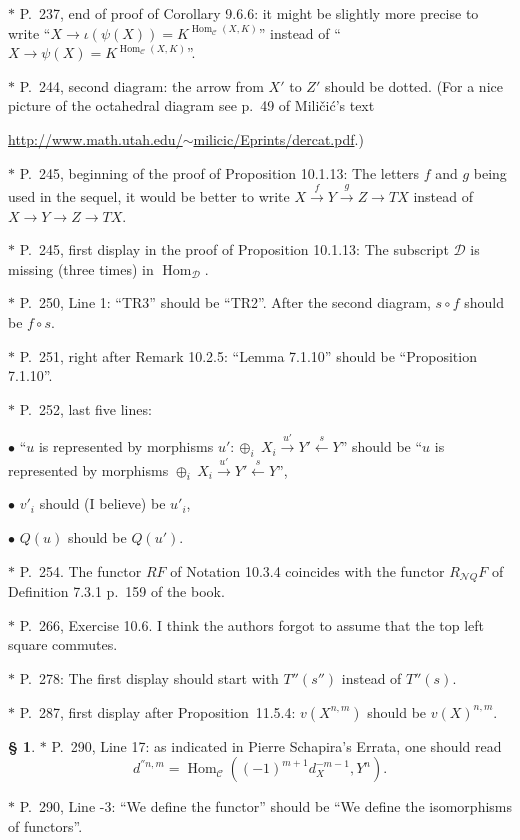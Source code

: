 \documentclass[12pt]{article}%
\theoremstyle{remark}
\theoremstyle{definition}
\newtheorem{s}[thm]{\S}%
\newcommand{\bu}{\bullet}
\newcommand{\nn}{\noindent}
\newcommand{\cc}{\mathcal}
\newcommand{\C}{\mathcal C}
\newcommand{\xr}{\xrightarrow}
\DeclareMathOperator{\Hom}{Hom}%
\begin{document}
\nn$*$ P.~237, end of proof of Corollary 9.6.6: it might be slightly more precise to write ``$X\to\iota(\psi(X))=K^{\Hom_\C(X,K)}$'' instead of ``$X\to\psi(X)=K^{\Hom_\C(X,K)}$''.

\nn$*$ P.~244, second diagram: the arrow from $X'$ to $Z'$ should be dotted. (For a nice picture of the octahedral diagram see p.~49 of Mili\v{c}i\'c's text

\href{http://www.math.utah.edu/~milicic/Eprints/dercat.pdf}{http://www.math.utah.edu/$\sim$milicic/Eprints/dercat.pdf}.)

\nn$*$ P.~245, beginning of the proof of Proposition 10.1.13: The letters $f$ and $g$ being used in the sequel, it would be better to write $X\xr fY\xr gZ\to TX$ instead of $X\to Y\to Z\to TX$. 

\nn$*$ P.~245, first display in the proof of Proposition 10.1.13: The subscript $\cc D$ is missing (three times) in $\Hom_{\cc D}$.

\nn$*$ P.~250, Line 1: ``TR3'' should be ``TR2''. After the second diagram, $s\circ f$ should be $f\circ s$.

\nn$*$ P.~251, right after Remark 10.2.5: ``Lemma 7.1.10'' should be ``Proposition 7.1.10''.

\nn$*$ P.~252, last five lines:

$\bu$ ``$u$ is represented by morphisms $u':\oplus_i\ X_i\xr{u'}Y'\xleftarrow sY$'' should be ``$u$ is represented by morphisms $\oplus_i\ X_i\xr{u'}Y'\xleftarrow sY$'',

$\bu$ $v'_i$ should (I believe) be $u'_i$,

$\bu$ $Q(u)$ should be $Q(u')$.

\nn$*$ P.~254. The functor $RF$ of Notation 10.3.4 coincides with the functor $R_{\cc NQ}F$ of Definition 7.3.1 p.~159 of the book.

\nn$*$ P.~266, Exercise 10.6. I think the authors forgot to assume that the top left square commutes.

\nn$*$ P.~278: The first display should start with $T''(s'')$ instead of $T''(s)$.

\nn$*$ P.~287, first display after Proposition~11.5.4: $v(X^{n,m})$ should be $v(X)^{n,m}$.

\begin{s}\label{290}
\nn$*$ P.~290, Line 17: as indicated in Pierre Schapira's Errata, one should read 
$$
d^{''n,m}=\Hom_\C((-1)^{m+1}d_X^{-m-1},Y^n).
$$
\end{s}

\nn$*$ P.~290, Line -3: ``We define the functor'' should be ``We define the isomorphisms of functors''.
\end{document}
